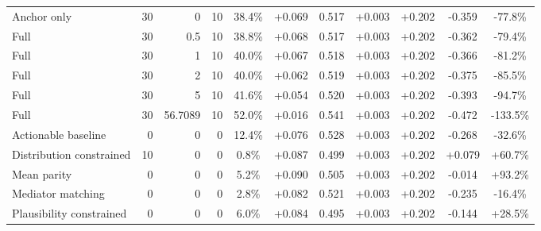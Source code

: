 \begin{table}[htbp]
\begin{tabular}{lrrrccccccc}
Anchor only & 30 & 0 & 10 & 38.4\% & +0.069 & 0.517 & +0.003 & +0.202 & -0.359 & -77.8\% \\
Full & 30 & 0.5 & 10 & 38.8\% & +0.068 & 0.517 & +0.003 & +0.202 & -0.362 & -79.4\% \\
Full & 30 & 1 & 10 & 40.0\% & +0.067 & 0.518 & +0.003 & +0.202 & -0.366 & -81.2\% \\
Full & 30 & 2 & 10 & 40.0\% & +0.062 & 0.519 & +0.003 & +0.202 & -0.375 & -85.5\% \\
Full & 30 & 5 & 10 & 41.6\% & +0.054 & 0.520 & +0.003 & +0.202 & -0.393 & -94.7\% \\
Full & 30 & 56.7089 & 10 & 52.0\% & +0.016 & 0.541 & +0.003 & +0.202 & -0.472 & -133.5\% \\
Actionable baseline & 0 & 0 & 0 & 12.4\% & +0.076 & 0.528 & +0.003 & +0.202 & -0.268 & -32.6\% \\
Distribution constrained & 10 & 0 & 0 & 0.8\% & +0.087 & 0.499 & +0.003 & +0.202 & +0.079 & +60.7\% \\
Mean parity & 0 & 0 & 0 & 5.2\% & +0.090 & 0.505 & +0.003 & +0.202 & -0.014 & +93.2\% \\
Mediator matching & 0 & 0 & 0 & 2.8\% & +0.082 & 0.521 & +0.003 & +0.202 & -0.235 & -16.4\% \\
Plausibility constrained & 0 & 0 & 0 & 6.0\% & +0.084 & 0.495 & +0.003 & +0.202 & -0.144 & +28.5\% \\
\bottomrule
\end{tabular}
\end{table}